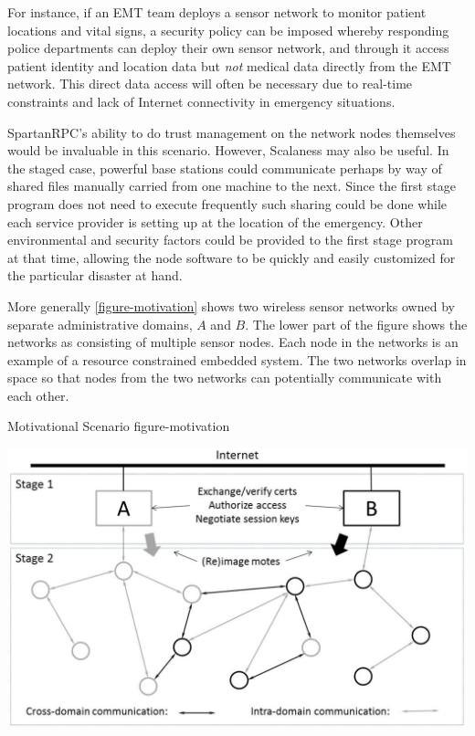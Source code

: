For instance, if an EMT team deploys a sensor network to monitor patient locations and vital
signs, a security policy can be imposed whereby responding police departments can deploy their
own sensor network, and through it access patient identity and location data but \emph{not}
medical data directly from the EMT network. This direct data access will often be necessary due
to real-time constraints and lack of Internet connectivity in emergency situations.

SpartanRPC's ability to do trust management on the network nodes themselves would be invaluable
in this scenario. However, Scalaness may also be useful. In the staged case, powerful base
stations could communicate perhaps by way of shared files manually carried from one machine to
the next. Since the first stage program does not need to execute frequently such sharing could
be done while each service provider is setting up at the location of the emergency. Other
environmental and security factors could be provided to the first stage program at that time,
allowing the node software to be quickly and easily customized for the particular disaster at
hand.

More generally \autoref{figure-motivation} shows two wireless sensor networks owned by separate
administrative domains, $A$ and $B$. The lower part of the figure shows the networks as
consisting of multiple sensor nodes. Each node in the networks is an example of a resource
constrained embedded system. The two networks overlap in space so that nodes from the two
networks can potentially communicate with each other.

\begin{fpfig*}[t]
  {Motivational Scenario}
  {figure-motivation}
  \begin{center}
    \includegraphics[scale=.40]{Figures/spartanrpc.eps}
  \end{center}
\end{fpfig*}


